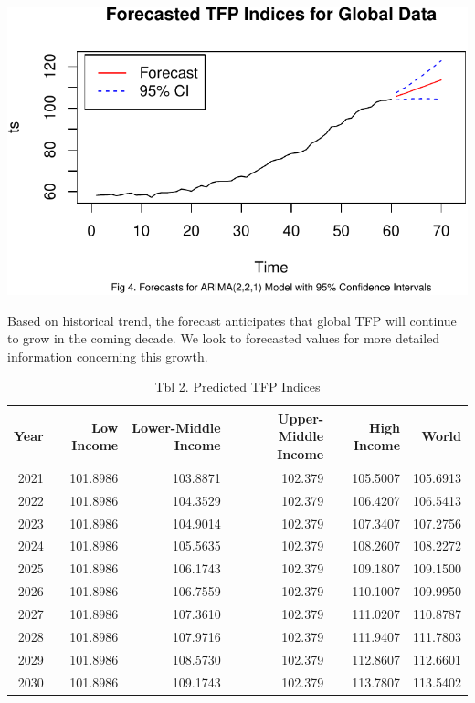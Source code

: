 \documentclass[
  letterpaper,
  DIV=11,
  numbers=noendperiod]{scrartcl}
\begin{document}
\includegraphics{Smith_Gabrielle_EDS222Final_files/figure-pdf/unnamed-chunk-6-1.pdf}

Based on historical trend, the forecast anticipates that global TFP will
continue to grow in the coming decade. We look to forecasted values for
more detailed information concerning this growth.

\begin{table}

\caption{Tbl 2. Predicted TFP Indices}
\centering
\begin{tabular}[t]{r|r|r|r|r|r}
\hline
Year & Low Income & Lower-Middle Income & Upper-Middle Income & High Income & World\\
\hline
2021 & 101.8986 & 103.8871 & 102.379 & 105.5007 & 105.6913\\
\hline
2022 & 101.8986 & 104.3529 & 102.379 & 106.4207 & 106.5413\\
\hline
2023 & 101.8986 & 104.9014 & 102.379 & 107.3407 & 107.2756\\
\hline
2024 & 101.8986 & 105.5635 & 102.379 & 108.2607 & 108.2272\\
\hline
2025 & 101.8986 & 106.1743 & 102.379 & 109.1807 & 109.1500\\
\hline
2026 & 101.8986 & 106.7559 & 102.379 & 110.1007 & 109.9950\\
\hline
2027 & 101.8986 & 107.3610 & 102.379 & 111.0207 & 110.8787\\
\hline
2028 & 101.8986 & 107.9716 & 102.379 & 111.9407 & 111.7803\\
\hline
2029 & 101.8986 & 108.5730 & 102.379 & 112.8607 & 112.6601\\
\hline
2030 & 101.8986 & 109.1743 & 102.379 & 113.7807 & 113.5402\\
\hline
\end{tabular}
\end{table}
\end{document}
